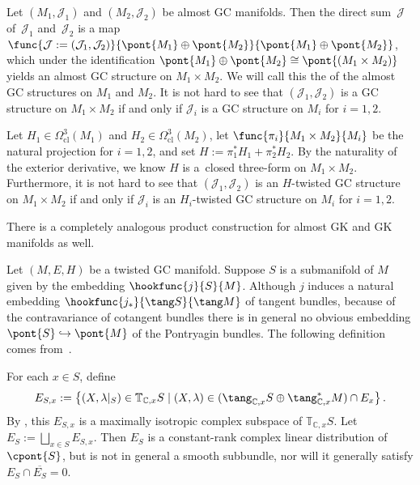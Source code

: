\begin{Example} \label{example2}
Let $(M_1,\mathcal{J}_1)$ and $(M_2,\mathcal{J}_2)$ be almost GC manifolds.  Then the direct sum~$\mathcal{J}$ of~$\mathcal{J}_1$ and~$\mathcal{J}_2$ is a map
  $
    \func{\mathcal{J}:=(\mathcal{J}_1, \mathcal{J}_2)}{
    \pont{M_1} \oplus \pont{M_2}
    }{
    \pont{M_1} \oplus \pont{M_2}
    }
  $,
which under the identif\/ication
  $
    \pont{M_1} \oplus \pont{M_2}
    \cong
    \pont{(M_1 \times M_2)}
  $
yields an almost GC structure on $M_1 \times M_2$.  We will call this the  of the almost GC structures on $M_1$ and $M_2$.  It is not hard to see that $(\mathcal{J}_1,\mathcal{J}_2)$ is a GC structure on $M_1 \times M_2$ if and only if $\mathcal{J}_i$ is a GC structure on $M_i$ for $i=1,2$.

Let $H_1 \in \Omega_{\text{cl}}^3(M_1)$ and $H_2 \in \Omega_{\text{cl}}^3(M_2)$, let $\func{\pi_i}{M_1 \times M_2}{M_i}$ be the natural projection for $i=1,2$, and set
$
  H := \pi_1^* H_1 + \pi_2^* H_2
$.
By the naturality of the exterior derivative, we know $H$ is a~closed three-form on $M_1 \times M_2$.  Furthermore, it is not hard to see that $(\mathcal{J}_1,\mathcal{J}_2)$ is an $H$-twisted GC structure on $M_1 \times M_2$ if and only if $\mathcal{J}_i$ is an $H_i$-twisted GC structure on $M_i$ for $i=1,2$.


There is a completely analogous product construction for almost GK and GK  manifolds as well.
\end{Example}


Let $(M,E,H)$ be a twisted GC manifold.  Suppose $S$ is a submanifold of $M$ given by the embedding $\hookfunc{j}{S}{M}$. Although $j$ induces a natural embedding $\hookfunc{j_*}{\tang S}{\tang M}$ of tangent bundles, because of the contravariance of cotangent bundles there is in general no obvious embedding $\pont{S} \hookrightarrow \pont{M}$ of the Pontryagin bundles.  The following def\/inition comes from~\cite{benbassat}.

For each $x \in S$, def\/ine
  \[
    E_{S,x}
    :=
    \left\{ \left( X, \lambda|_{S} \right) \in
    \mathbb{T}_{\mathbb{C},x} S
    \mid (X, \lambda) \in (\tang_{\mathbb{C},x} S \oplus \tang_{\mathbb{C},x}^* M ) \cap E_x \right\}.
  \]
By \cite[Lemma 8.2]{benbassat}, this $E_{S,x}$ is a maximally isotropic complex subspace of $\mathbb{T}_{\mathbb{C}, x} S$.
Let $E_S := \bigsqcup_{x \in S} E_{S, x}$.  Then $E_S$ is a constant-rank complex linear distribution of $\cpont{S}$, but is not in general a smooth subbundle, nor will it generally satisfy $E_S \cap \overline{E_S} = 0$.


